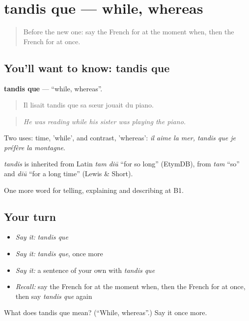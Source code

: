\section[tandis que]{tandis que — while, whereas}

\label{lesson:FR-C269-tandis-que}



\begin{quote}
Before the new one: say the French for at the moment when, then the French for at once.
\end{quote}

\subsection*{You'll want to know: tandis que}
\textbf{tandis que} — \textquotedblleft{}while, whereas\textquotedblright{}.

\begin{quote}
Il lisait tandis que sa sœur jouait du piano.
\end{quote}

\begin{quote}
\emph{He was reading while his sister was playing the piano.}
\end{quote}

Two uses: time, 'while', and contrast, 'whereas': \emph{il aime la mer, tandis que je préfère la montagne}.

\begin{cousinweb}
\emph{tandis} is inherited from Latin \emph{tam diū} \textquotedblleft{}for so long\textquotedblright{} (EtymDB), from \emph{tam} \textquotedblleft{}so\textquotedblright{} and \emph{diū} \textquotedblleft{}for a long time\textquotedblright{} (Lewis \& Short).
\end{cousinweb}

\begin{grammarlens}[title={What you've built}]
One more word for telling, explaining and describing at B1.
\end{grammarlens}

\subsection*{Your turn}
\begin{itemize}
\raggedright
  \item \emph{Say it:} \emph{tandis que}
  \item \emph{Say it:} \emph{tandis que}, once more
  \item \emph{Say it:} a sentence of your own with \emph{tandis que}
  \item \emph{Recall:} say the French for at the moment when, then the French for at once, then say \emph{tandis que} again
\end{itemize}

\begin{tcolorbox}[breakable,colback=teal!4,colframe=teal!35!black,title={Before you move on}]
What does tandis que mean? (\textquotedblleft{}While, whereas\textquotedblright{}.) Say it once more.
\end{tcolorbox}
